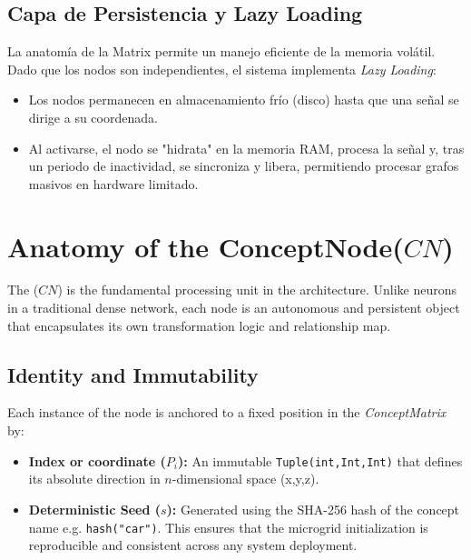 \documentclass[12pt]{article}
\begin{document}
\subsection{Capa de Persistencia y Lazy Loading}
La anatomía de la Matrix permite un manejo eficiente de la memoria volátil. Dado que los nodos son independientes, el sistema implementa \textit{Lazy Loading}:
\begin{itemize}
	\item Los nodos permanecen en almacenamiento frío (disco) hasta que una señal se dirige a su coordenada.
	\item Al activarse, el nodo se "hidrata" en la memoria RAM, procesa la señal y, tras un periodo de inactividad, se sincroniza y libera, permitiendo procesar grafos masivos en hardware limitado.
\end{itemize}








\section{Anatomy of the ConceptNode($CN$)}

The ($CN$) is the fundamental processing unit in the architecture. Unlike neurons in a traditional dense network,
each node is an autonomous and persistent object that encapsulates its own transformation logic and relationship map.

\subsection{Identity and Immutability}

Each instance of the node is anchored to a fixed position in the \textit{ConceptMatrix} by:
\begin{itemize}
    \item \textbf{Index or coordinate ($P_i$):} An immutable \texttt{Tuple(int,Int,Int)} that defines its absolute direction in $n$-dimensional space (x,y,z).
    \item \textbf{Deterministic Seed ($s$):} Generated using the SHA-256 hash of the concept name e.g. \texttt{hash("car")}. This ensures that the microgrid initialization is reproducible and consistent across any system deployment.
\end{itemize}
\end{document}

